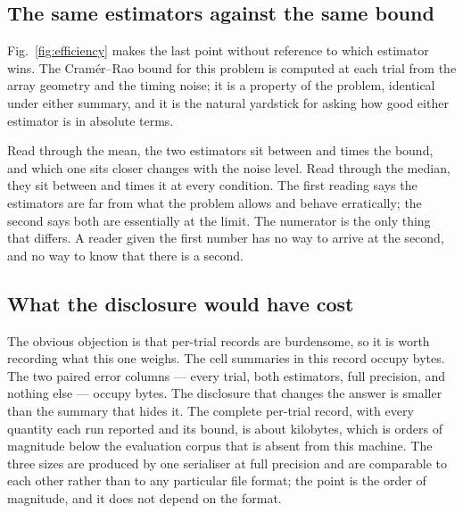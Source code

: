 \subsection{The same estimators against the same bound}

Fig.~\ref{fig:efficiency} makes the last point without reference to which
estimator wins. The Cram\'er--Rao bound for this problem is computed at each
trial from the array geometry and the timing noise; it is a property of the
problem, identical under either summary, and it is the natural yardstick for
asking how good either estimator is in absolute terms.

Read through the mean, the two estimators sit between \CxEffMeanLow{} and
\CxEffMeanHigh{} times the bound, and which one sits closer changes with the
noise level. Read through the median, they sit between \CxEffMedianLow{} and
\CxEffMedianHigh{} times it at every condition. The first reading says the
estimators are far from what the problem allows and behave erratically; the
second says both are essentially at the limit. The numerator is the only thing
that differs. A reader given the first number has no way to arrive at the
second, and no way to know that there is a second.

\subsection{What the disclosure would have cost}

The obvious objection is that per-trial records are burdensome, so it is worth
recording what this one weighs. The cell summaries in this record occupy
\CxBytesCells{} bytes. The two paired error columns --- every trial, both
estimators, full precision, and nothing else --- occupy \CxBytesMinimal{} bytes.
The disclosure that changes the answer is smaller than the summary that hides
it. The complete per-trial record, with every quantity each run reported and its
bound, is about \CxBytesTrials{} kilobytes, which is \CxCorpusOrders{} orders of
magnitude below the evaluation corpus that is absent from this machine.
The three sizes are produced by one serialiser at full precision and are
comparable to each other rather than to any particular file format; the point is
the order of magnitude, and it does not depend on the format.

\begin{table}[tbp]
\centering
\caption{One record of \CxPlanned{} paired trials, read under \CxRules{}
summaries. Columns are timing-noise levels; the estimator named by each summary
is given in italics beneath the quantities that decide it. Trials returning an
error can be fewer than trials run, because a diverged run reports none.}
\label{tab:complement}
\small

\end{table}

